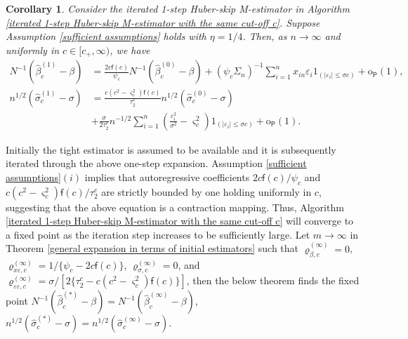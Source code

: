 \documentclass[11pt, letterpaper]{article}
\newtheorem{corollary}{Corollary}
\numberwithin{algorithm}{section}
\numberwithin{assumption}{section}
\numberwithin{lemma}{section}
\numberwithin{theorem}{section}
\numberwithin{corollary}{section}
\numberwithin{remark}{section}
\numberwithin{equation}{section}
\numberwithin{figure}{section}
\numberwithin{table}{section}
\begin{document}
\begin{corollary} \label{expansion of the first step estimators}
Consider the iterated 1-step Huber-skip M-estimator in Algorithm \ref{iterated 1-step Huber-skip M-estimator with the same cut-off c}. Suppose Assumption \ref{sufficient assumptions} holds with $\eta = 1/4$. Then, as $n \to \infty$ and uniformly in $c \in [c_{+}, \infty)$, we have
\begin{align*}
N^{-1} (\widehat{\beta}_{c}^{(1)} - \beta) & = \frac{2 c \mathsf{f}(c)}{\psi_{c}} N^{-1} (\widehat{\beta}_{c}^{(0)} - \beta) +  (\psi_{c} \Sigma_{n})^{-1} \sum_{i = 1}^{n} x_{in} \varepsilon_{i} 1_{(|\varepsilon_{i}| \le \sigma c)} +  \mathrm{o}_{\mathsf{P}}(1), \\
n^{1/2} (\widehat{\sigma}_{c}^{(1)} - \sigma) & = \frac{c (c^{2} - \varsigma_{c}^{2}) \mathsf{f}(c)}{\tau_{2}^{c}} n^{1/2} (\widehat{\sigma}_{c}^{(0)} - \sigma) \\
& + \frac{\sigma}{2 \tau_{2}^{c}} n^{-1/2} \sum_{i=1}^{n} (\frac{\varepsilon_{i}^{2}}{\sigma^{2}} - \varsigma_{c}^{2}) 1_{(|\varepsilon_{i}| \le \sigma c)} +  \mathrm{o}_{\mathsf{P}}(1).
\end{align*}
\end{corollary}

Initially the tight estimator is assumed to be available and it is subsequently iterated through the above one-step expansion. Assumption \ref{sufficient assumptions}$(i)$ implies that autoregressive coefficients $2c \mathsf{f}(c)/\psi_{c}$ and $c(c^{2} - \varsigma_{c}^{2})\mathsf{f}(c)/\tau_{2}^{c}$ are strictly bounded by one holding uniformly in $c$, suggesting that the above equation is a contraction mapping. Thus, Algorithm \ref{iterated 1-step Huber-skip M-estimator with the same cut-off c} will converge to a fixed point as the iteration step increases to be sufficiently large. Let $m \to \infty$ in Theorem \ref{general expansion in terms of initial estimators} such that $\varrho_{\beta, c}^{(\infty)} = 0$, $\varrho_{x \varepsilon, c}^{(\infty)} = 1 / \{ \psi_{c} - 2 c \mathsf{f}(c) \}$, $\varrho_{\sigma, c}^{(\infty)} = 0$, and $\varrho_{\varepsilon \varepsilon, c}^{(\infty)} = \sigma / [ 2 \{ \tau_{2}^{c} - c (c^{2} - \varsigma_{c}^{2}) \mathsf{f}(c) \} ]$, then the below theorem finds the fixed point $N^{-1} (\widehat{\beta}_{c}^{(\ast)} - \beta) = N^{-1} (\widehat{\beta}_{c}^{(\infty)} - \beta)$, $n^{1/2} (\widehat{\sigma}_{c}^{(\ast)} - \sigma) = n^{1/2} (\widehat{\sigma}_{c}^{(\infty)} - \sigma)$.
\end{document}
